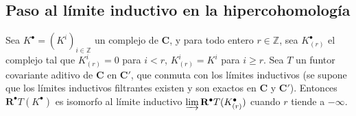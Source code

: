 \subsection{Paso al límite inductivo en la hipercohomología}
\label{subsection:0.11.5}
\label{subsection:0.11.5-fr}

\begin{lemma}[11.5.1]
\label{0.11.5.1-fr}
Sea $K^\bullet=(K^i)_{i\in\mathbb Z}$ un complejo de $\boldsymbol{C}$, y para todo entero $r\in\mathbb Z$, sea $K_{(r)}^\bullet$ el complejo tal que $K_{(r)}^i=0$ para $i<r$, $K_{(r)}^i=K^i$ para $i\geq r$. Sea $T$ un funtor covariante aditivo
de $\boldsymbol{C}$ en $\boldsymbol{C}'$, que conmuta con los límites inductivos (se supone que los límites inductivos filtrantes existen y son exactos en $\boldsymbol{C}$ y $\boldsymbol{C}'$). Entonces $\mathbf R^\bullet T(K^\bullet)$ es isomorfo al límite inductivo $\varinjlim\mathbf R^\bullet T(K_{(r)}^\bullet)$ cuando $r$ tiende a $-\infty$.
\end{lemma}

